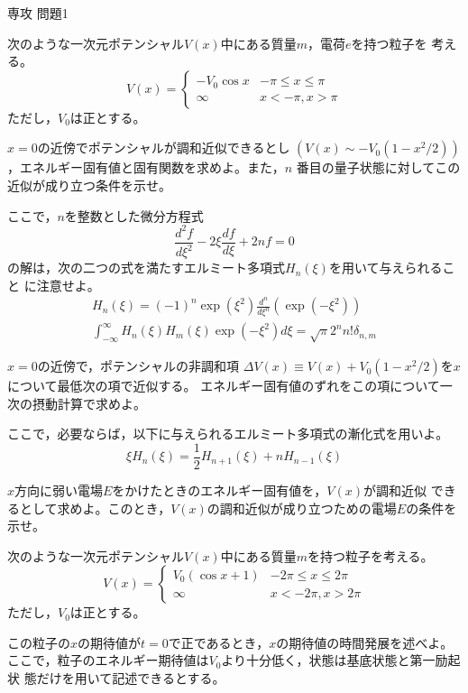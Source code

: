 \documentclass[fleqn]{jbook}
\begin{document}
\begin{question}{専攻 問題1}{}
\begin{subquestions}
\SubQuestion

次のような一次元ポテンシャル$V(x)$中にある質量$m$，電荷$e$を持つ粒子を
考える。
\[V(x)=\left\{\begin{array}{ll}-V_0\cos x&-\pi\leq x\leq\pi \\
\infty & x<-\pi,x>\pi \end{array}\right.\]
ただし，$V_0$は正とする。

\begin{subsubquestions}
\SubSubQuestion

$x=0$の近傍でポテンシャルが調和近似できるとし
$(V(x)\sim-V_0(1-x^2/2))$，エネルギー固有値と固有関数を求めよ。また，$n$
番目の量子状態に対してこの近似が成り立つ条件を示せ。

ここで，$n$を整数とした微分方程式
\[\frac{d^2f}{d\xi^2}-2\xi\frac{df}{d\xi}+2nf=0\]
の解は，次の二つの式を満たすエルミート多項式$H_n(\xi)$を用いて与えられること
に注意せよ。
\begin{eqnarray*}
&\displaystyle{
H_n(\xi)=(-1)^n\exp(\xi^2)\frac{d^n}{d\xi^n}(\exp(-\xi^2))} &\\
&\displaystyle{\int_{-\infty}^{\infty}H_n(\xi)H_m(\xi)\exp(-\xi^2)d\xi=
\sqrt{\pi}
2^nn!\delta_{n,m}} \end{eqnarray*}

\SubSubQuestion
$x=0$の近傍で，ポテンシャルの非調和項
$\Delta V(x)\equiv V(x)+V_0(1-x^2/2)$を$x$について最低次の項で近似する。
エネルギー固有値のずれをこの項について一次の摂動計算で求めよ。

ここで，必要ならば，以下に与えられるエルミート多項式の漸化式を用いよ。
\[\xi H_n(\xi)=\frac{1}{2}H_{n+1}(\xi)+nH_{n-1}(\xi) \]

\SubSubQuestion
$x$方向に弱い電場$E$をかけたときのエネルギー固有値を，$V(x)$が調和近似
できるとして求めよ。このとき，$V(x)$の調和近似が成り立つための電場$E$の条件を
示せ。
\end{subsubquestions}


\SubQuestion
 次のような一次元ポテンシャル$V(x)$中にある質量$m$を持つ粒子を考える。
\[ V(x)=\left\{\begin{array}{ll}V_0(\cos x +1)&-2\pi\leq x\leq 2\pi \\
\infty & x<-2\pi,x>2\pi \end{array}\right.\]
ただし，$V_0$は正とする。

この粒子の$x$の期待値が$t=0$で正であるとき，$x$の期待値の時間発展を述べよ。
ここで，粒子のエネルギー期待値は$V_0$より十分低く，状態は基底状態と第一励起状
態だけを用いて記述できるとする。
\end{subquestions}

\end{question}
\end{document}
